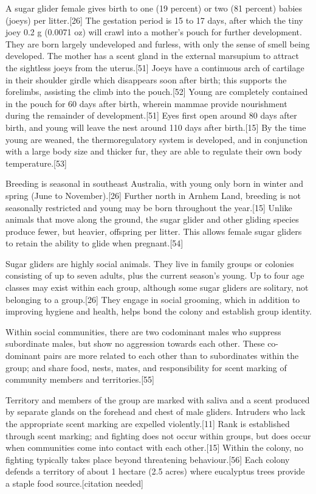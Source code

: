 \documentclass[twoside, 12pt, letterpaper]{report}\usepackage[]{graphicx}\usepackage[]{color}
\begin{document}
\begin{multicols*}{2}
A sugar glider female gives birth to one (19 percent) or two (81 percent) babies (joeys) per litter.[26] The gestation period is 15 to 17 days, after which the tiny joey 0.2 g (0.0071 oz) will crawl into a mother's pouch for further development. They are born largely undeveloped and furless, with only the sense of smell being developed. The mother has a scent gland in the external marsupium to attract the sightless joeys from the uterus.[51] Joeys have a continuous arch of cartilage in their shoulder girdle which disappears soon after birth; this supports the forelimbs, assisting the climb into the pouch.[52] Young are completely contained in the pouch for 60 days after birth, wherein mammae provide nourishment during the remainder of development.[51] Eyes first open around 80 days after birth, and young will leave the nest around 110 days after birth.[15] By the time young are weaned, the thermoregulatory system is developed, and in conjunction with a large body size and thicker fur, they are able to regulate their own body temperature.[53]

Breeding is seasonal in southeast Australia, with young only born in winter and spring (June to November).[26] Further north in Arnhem Land, breeding is not seasonally restricted and young may be born throughout the year.[15] Unlike animals that move along the ground, the sugar glider and other gliding species produce fewer, but heavier, offspring per litter. This allows female sugar gliders to retain the ability to glide when pregnant.[54]

Sugar gliders are highly social animals. They live in family groups or colonies consisting of up to seven adults, plus the current season's young. Up to four age classes may exist within each group, although some sugar gliders are solitary, not belonging to a group.[26] They engage in social grooming, which in addition to improving hygiene and health, helps bond the colony and establish group identity.

Within social communities, there are two codominant males who suppress subordinate males, but show no aggression towards each other. These co-dominant pairs are more related to each other than to subordinates within the group; and share food, nests, mates, and responsibility for scent marking of community members and territories.[55]

Territory and members of the group are marked with saliva and a scent produced by separate glands on the forehead and chest of male gliders. Intruders who lack the appropriate scent marking are expelled violently.[11] Rank is established through scent marking; and fighting does not occur within groups, but does occur when communities come into contact with each other.[15] Within the colony, no fighting typically takes place beyond threatening behaviour.[56] Each colony defends a territory of about 1 hectare (2.5 acres) where eucalyptus trees provide a staple food source.[citation needed]


\end{multicols*}
\end{document}
